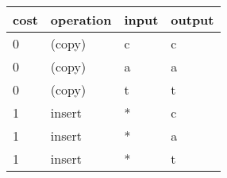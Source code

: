\documentclass[aspectratio=169]{beamer}
\begin{document}
\begin{frame}[shrink=15]
\vfill

\bigskip

\begin{tabular}{ll||l|l}
cost & operation & input & output\\\hline\hline
0 & (copy)  &c&c\\\hline
0 & (copy)  &a&a\\\hline
0 & (copy)  &t&t\\\hline
1 & insert  &*&c\\\hline
1 & insert  &*&a\\\hline
1 & insert  &*&t\\\hline

\end{tabular}
\end{frame}
\end{document}
